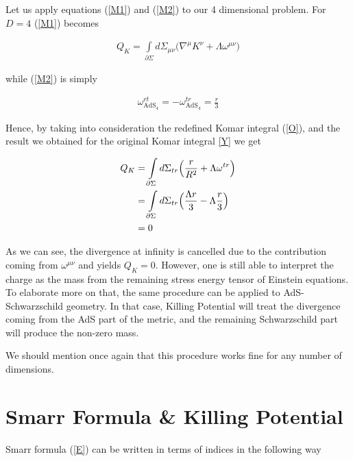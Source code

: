 \documentclass[a4paper,notitlepage]{report}
\begin{document}
\vspace{0.5 em}
Let us apply equations (\ref{M1}) and (\ref{M2}) to our 4 dimensional problem. For $D=4$ (\ref{M1}) becomes

\begin{align} 
Q_K = \int\limits_{\partial\Sigma} d\Sigma_{\mu\nu} \Big( \nabla^\mu K^\nu + \Lambda \omega^{\mu\nu} \Big)
\end{align}

\vspace{0.5em}
while (\ref{M2}) is simply

\begin{align} 
\omega^{rt}_{\text{AdS$_4$}} = -\omega^{tr}_{\text{AdS$_4$}} = \frac{r}{3}
\end{align}

\vspace{0.5em}
Hence, by taking into consideration the redefined Komar integral (\ref{O}), and the result we obtained for the original Komar integral \ref{Y} we get

\begin{align}
Q_{K} &= \int\limits_{\partial\Sigma} d\Sigma_{tr} \Big( \frac{r}{R^2} + \Lambda \omega^{tr} \Big) \\ \notag
&= \int\limits_{\partial\Sigma} d\Sigma_{tr} \Big( \frac{\Lambda r}{3} - \Lambda  \frac{r}{3} \Big) \notag \\
& = 0
\end{align}

\vspace{0.5 em}
As we can see, the divergence at infinity is cancelled due to the contribution coming from $\omega^{\mu\nu}$ and yields $Q_K = 0$. However, one is still able to interpret the charge as the mass from the remaining stress energy tensor of Einstein equations. To elaborate more on that, the same procedure can be applied to AdS-Schwarzschild geometry. In that case, Killing Potential will treat the divergence coming from the AdS part of the metric, and the remaining Schwarzschild part will produce the non-zero mass.

We should mention once again that this procedure works fine for any number of dimensions.

\section{Smarr Formula \& Killing Potential}

Smarr formula (\ref{E}) can be written in terms of indices in the following way
\end{document}
